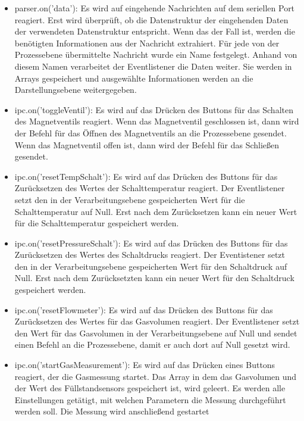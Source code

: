 \begin{itemize}
\itemsep0em

 \item parser.on('data'): Es wird auf eingehende Nachrichten auf dem seriellen Port reagiert. Erst wird überprüft, ob die Datenstruktur der eingehenden Daten der verwendeten Datenstruktur entspricht. Wenn das der Fall ist, werden die benötigten Informationen aus der Nachricht extrahiert. Für jede von der Prozessebene übermittelte Nachricht wurde ein Name festgelegt. Anhand von diesem Namen verarbeitet der Eventlistener die Daten weiter. Sie werden in Arrays gespeichert und ausgewählte Informationen werden an die Darstellungsebene weitergegeben.
 
 \item ipc.on('toggleVentil'): Es wird auf das Drücken des Buttons für das Schalten des Magnetventils reagiert. Wenn das Magnetventil geschlossen ist, dann wird der Befehl für das Öffnen des Magnetventils an die Prozessebene gesendet. Wenn das Magnetventil offen ist, dann wird der Befehl für das Schließen gesendet.
 
 \item ipc.on('resetTempSchalt'): Es wird auf das Drücken des Buttons für das Zurücksetzen des Wertes der Schalttemperatur reagiert. Der Eventlistener setzt den in der Verarbeitungsebene gespeicherten Wert für die Schalttemperatur auf Null. Erst nach dem Zurücksetzen kann ein neuer Wert für die Schalttemperatur gespeichert werden.
 
 \item ipc.on('resetPressureSchalt'): Es wird auf das Drücken des Buttons für das Zurücksetzen des Wertes des Schaltdrucks reagiert. Der Eventistener setzt den in der Verarbeitungsebene gespeicherten Wert für den Schaltdruck auf Null. Erst nach dem Zurücksetzten kann ein neuer Wert für den Schaltdruck gespeichert werden.
 
 \item ipc.on('resetFlowmeter'): Es wird auf das Drücken des Buttons für das Zurücksetzen des Wertes für das Gasvolumen reagiert. Der Eventlistener setzt den Wert für das Gasvolumen in der Verarbeitungsebene auf Null und sendet einen Befehl an die Prozessebene, damit er auch dort auf Null gesetzt wird.
 
 \item ipc.on('startGasMeasurement'): Es wird auf das Drücken eines Buttons reagiert, der die Gasmessung startet. Das Array in dem das Gasvolumen und der Wert des Füllstandsensors gespeichert ist, wird geleert. Es werden alle Einstellungen getätigt, mit welchen Parametern die Messung durchgeführt werden soll. Die Messung wird anschließend gestartet
 

\end{itemize}
